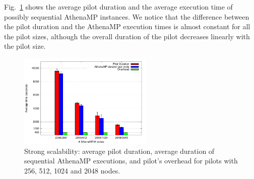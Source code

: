 Fig.~\ref{fig:strongScala}  shows the average pilot duration and the average
execution time of possibly sequential AthenaMP instances.  We  notice that the
difference between the pilot duration and the AthenaMP execution times is almost
constant for all the pilot sizes, although the overall duration of the pilot
decreases linearly with the pilot size.

\begin{figure}[!t]
        \includegraphics[height=4.5cm,width=\columnwidth]{./figures/NGE/strong.pdf}
        \vspace{-0.3in}
    \caption{Strong scalability:  average pilot duration, average duration of
    sequential AthenaMP executions, and pilot's overhead for pilots with 256, 512, 1024 and 2048 nodes.}
\label{fig:strongScala}
\end{figure}

\vspace{-0.05in}
